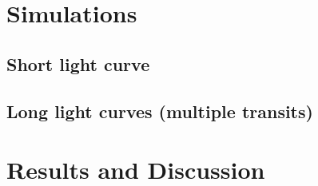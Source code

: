 \documentclass[twocolumn]{aastex631}
\begin{document}
\section{Simulations}
\subsection{Short light curve}
\subsection{Long light curves (multiple transits)}
\section{Results and Discussion}


\end{document}
